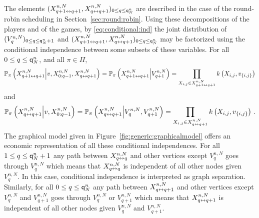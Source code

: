 The elements $(X^{n,N}_{q+1\leftrightarrow q+1},X^{n,N}_{q\leftrightarrow q+1})_{0\le q \le {\mathsf{q}}^{n}_{N}}$ are described in the case of the round-robin scheduling in Section~\ref{sec:round:robin}.
Using these decompositions of the players and of the games, by \eqref{eq:conditional:ind} the joint distribution of 
$(V_q^{n,N})_{0\le q\le {\mathsf{q}}^{n}_{N}+1}$ and $(X^{n,N}_{q+1\leftrightarrow q+1},X^{n,N}_{q\leftrightarrow q+1})_{0\le q \le {\mathsf{q}}^{n}_{N}}$ may be factorized using the conditional independence between some subsets of these variables. For all $0\le q \le {\mathsf{q}}^{n}_{N}$, and all $\pi\in\Pi$,
\[
\mathbb{P}_{\pi}\left(X^{n,N}_{q+1\leftrightarrow q+1}\middle| v,X^{n,N}_{0:q-1},X_{q \leftrightarrow q+1}^{n,N}\right) = \mathbb{P}_{\pi}\left(X^{n,N}_{q+1\leftrightarrow q+1}\middle| V^{n,N}_{q+1}\right)=\prod_{X_{i,j}\in X^{n,N}_{q+1\leftrightarrow q+1}}k\left(X_{i,j},v_{\{i,j\}}\right)
\]
and
\[
\mathbb{P}_{\pi}\left(X^{n,N}_{q\leftrightarrow q+1}\middle| v,X^{n,N}_{0:q-1}\right) = \mathbb{P}_{\pi}\left(X^{n,N}_{q\leftrightarrow q+1}\middle| V^{n,N}_{q},V^{n,N}_{q+1}\right)=\prod_{X_{i,j}\in X^{n,N}_{q\leftrightarrow q+1}}k\left(X_{i,j},v_{\{i,j\}}\right)\,.
\]
The graphical model given in Figure~\ref{fig:generic:graphicalmodel} offers an economic representation of all these conditional independences. For all $1\le q \le {\mathsf{q}}^{n}_{N}+1$ any path between $X^{n,N}_{q\leftrightarrow q}$ and other vertices except $V_q^{n,N}$ goes through $V_q^{n,N}$ which means that $X^{n,N}_{q\leftrightarrow q}$ is independent of all other nodes given $V_q^{n,N}$. In this case, conditional independence is interpreted as graph separation. Similarly, for all $0\le q \le {\mathsf{q}}^{n}_{N}$ any path between $X^{n,N}_{q\leftrightarrow q+1}$ and other vertices except $V_q^{n,N}$ and $V_{q+1}^{n,N}$ goes through $V_{q}^{n,N}$ or $V_{q+1}^{n,N}$ which means that $X^{n,N}_{q\leftrightarrow q+1}$ is independent of all other nodes given $V_q^{n,N}$ and $V_{q+1}^{n,N}$.

